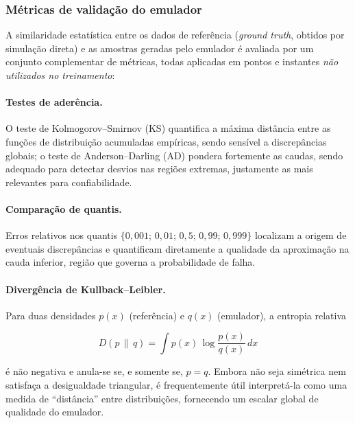 \subsubsection{M\'etricas de valida\c{c}\~ao do emulador}
\label{subsec:metricas}

A similaridade estatística entre os dados de referência (\textit{ground truth}, obtidos por simulação direta) e as amostras geradas pelo emulador é avaliada por um conjunto complementar de métricas, todas aplicadas em pontos e instantes \textit{não utilizados no treinamento}:

\paragraph{Testes de ader\^encia.} O teste de Kolmogorov--Smirnov (KS) \parencite{massey1951} quantifica a máxima distância entre as funções de distribuição acumuladas empíricas, sendo sensível a discrepâncias globais; o teste de Anderson--Darling (AD) \parencite{anderson1952, scholz1987} pondera fortemente as caudas, sendo adequado para detectar desvios nas regiões extremas, justamente as mais relevantes para confiabilidade.

\paragraph{Compara\c{c}\~ao de quantis.} Erros relativos nos quantis $\{0{,}001;\, 0{,}01;\, 0{,}5;\, 0{,}99;\, 0{,}999\}$ localizam a origem de eventuais discrepâncias e quantificam diretamente a qualidade da aproximação na cauda inferior, região que governa a probabilidade de falha.

\paragraph{Diverg\^encia de Kullback--Leibler.} Para duas densidades $p(x)$ (referência) e $q(x)$ (emulador), a entropia relativa \parencite{kullback1951, cover2006}

\begin{equation}
D(p \,\|\, q) = \int p(x)\, \log \frac{p(x)}{q(x)}\, dx
\label{eq:kl_continua}
\end{equation}

\noindent é não negativa e anula-se se, e somente se, $p = q$. Embora não seja simétrica nem satisfaça a desigualdade triangular, é frequentemente útil interpretá-la como uma medida de ``distância'' entre distribuições, fornecendo um escalar global de qualidade do emulador.

